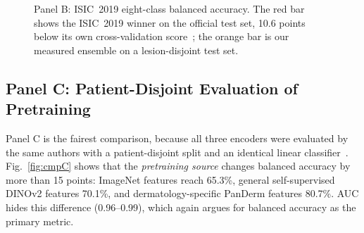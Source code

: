 \begin{figure}[t]
\centering
{}
\caption{Panel B: ISIC~2019 eight-class balanced accuracy. The red bar
shows the ISIC~2019 winner on the official test set, 10.6 points below
its own cross-validation score~\cite{gessert2020,ayas2023swin,baykal2024convnext};
the orange bar is our measured ensemble on a lesion-disjoint test set.}
\label{fig:cmpB}
\end{figure}

\subsection{Panel C: Patient-Disjoint Evaluation of Pretraining}
Panel C is the fairest comparison, because all three encoders were
evaluated by the same authors with a patient-disjoint split and an
identical linear classifier~\cite{yan2025panderm}. Fig.~\ref{fig:cmpC}
shows that the \emph{pretraining source} changes balanced accuracy by
more than 15 points: ImageNet features reach 65.3\%, general
self-supervised DINOv2 features 70.1\%, and dermatology-specific PanDerm
features 80.7\%. AUC hides this difference (0.96--0.99), which again
argues for balanced accuracy as the primary metric.

